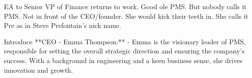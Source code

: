 EA to Senior VP of Finance returns to work.
Good ole PMS. But nobody calls it PMS. Not in front of the CEO/founder. She would kick their teeth in.
She calls it Pre as in Steve Prefontain's nick name.

Introduce **CEO - Emma Thompson:**
   - Emma is the visionary leader of PMS, responsible for setting the overall strategic direction and ensuring the company's success. With a background in engineering and a keen business sense, she drives innovation and growth.

